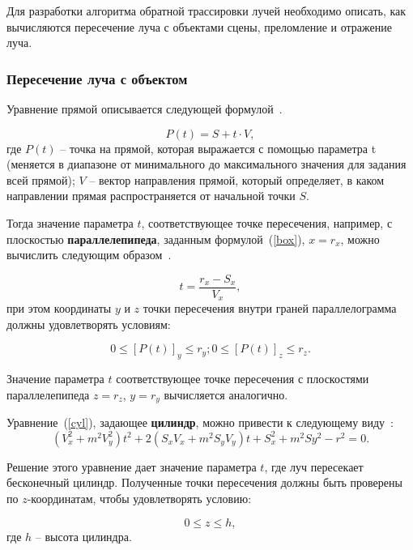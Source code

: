 Для разработки алгоритма обратной трассировки лучей необходимо описать, как вычисляются пересечение луча с объектами сцены, преломление и отражение луча.

\subsubsection*{Пересечение луча с объектом}

Уравнение прямой описывается следующей формулой~\cite[c.~140]{lengyel2011mathematics}.

\begin{equation}
P(t) = S + t \cdot V,
\end{equation}
где $P(t)$ -- точка на прямой, которая выражается с помощью параметра t (меняется в диапазоне от минимального до максимального значения для задания всей прямой); $V$ -- вектор направления прямой, который определяет, в каком направлении прямая распространяется от начальной точки $S$.

Тогда значение параметра $t$, соответствующее точке пересечения, например, с плоскостью \textbf{параллелепипеда}, заданным формулой~(\ref{box}), $x = r_x$, можно вычислить следующим образом~\cite[c.~143]{lengyel2011mathematics}. 

\begin{equation}
	t = \frac{r_x - S_x}{V_x},
\end{equation} при этом
координаты $y$ и $z$ точки пересечения внутри граней параллелограмма должны удовлетворять условиям:

\begin{equation}
 	0 \leq [P(t)]_y \leq r_y;	0 \leq [P(t)]_z \leq r_z.
\end{equation}

Значение параметра $t$ соответствующее точке пересечения с плоскостями параллелепипеда  $z = r_z$, $y = r_y$ вычисляется аналогично.

Уравнение~(\ref{cyl}), задающее \textbf{цилиндр}, можно привести к следующему виду~\cite[С.~145--146]{lengyel2011mathematics}:
\begin{equation}
	(V_x^2 + m^2V_y^2)t^2 + 2(S_xV_x + m^2S_yV_y)t + S_x^2 + m^2Sy^2 - r^2 = 0.
\end{equation}

Решение этого уравнение дает значение параметра $t$, где луч пересекает бесконечный цилиндр. Полученные точки пересечения должны быть проверены по $z$-координатам, чтобы удовлетворять условию:

\begin{equation}
	0 \leq z \leq h,
\end{equation}
где $h$ -- высота цилиндра.

